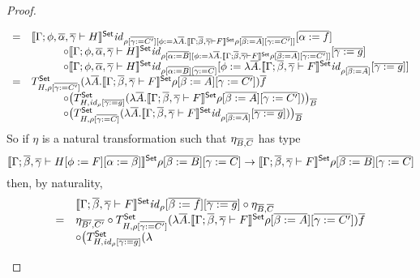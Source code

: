 \documentclass[runningheads]{llncs}
\newcommand{\set}{\mathsf{Set}}
\renewcommand{\id}{\mathit{id}}
\renewcommand{\id}{\mathit{id}}
\begin{document}
\begin{proof}
\begin{itemize}
\[\begin{array}{ll}
=& \setsem{\Gamma; \phi, \ol{\alpha}, \ol{\gamma} \vdash H} \id_{\rho
  [\ol{\gamma := C'}][\phi := \lambda \ol{A}. \setsem{\Gamma;
      \ol{\beta}, \ol{\gamma} \vdash F} \rho [\ol{\beta := A}]
    [\ol{\gamma := C'}]]} [\ol{\alpha := f}] \\
&\hspace{3em} \circ \setsem{\Gamma; \phi, \ol{\alpha}, \ol{\gamma}
  \vdash H} \id_{\rho [\ol{\alpha := B}][\phi := \lambda
    \ol{A}. \setsem{\Gamma; \ol{\beta}, \ol{\gamma} \vdash F} \rho
       [\ol{\beta := A}] [\ol{\gamma := C'}]]} [\ol{\gamma := g}] \\
&\hspace{3em} \circ \setsem{\Gamma; \phi, \ol{\alpha}, \ol{\gamma}
  \vdash H} \id_{\rho [\ol{\alpha := B}] [\ol{\gamma := C}]} [\phi :=
  \lambda \ol{A}. \setsem{\Gamma; \ol{\beta}, \ol{\gamma} \vdash F}
  \id_{\rho [\ol{\beta := A}]} [\ol{\gamma := g}]] \\
= & T^{\set}_{H,\rho [\ol{\gamma := C'}]} (\lambda
\ol{A}. \setsem{\Gamma; \ol{\beta}, \ol{\gamma} \vdash F} \rho
   [\ol{\beta := A}] [\ol{\gamma := C'}]) \ol{f} \\
&\hspace{3em} \circ \big( T^{\set}_{H,\id_{\rho}[\ol{\gamma := g}]}
   (\lambda \ol{A}. \setsem{\Gamma; \ol{\beta}, \ol{\gamma} \vdash F}
   \rho [\ol{\beta := A}] [\ol{\gamma := C'}]) \big)_{\ol{B}} \\
&\hspace{3em} \circ \big( T^{\set}_{H,\rho [\ol{\gamma := C}]} (\lambda
   \ol{A}. \setsem{\Gamma; \ol{\beta}, \ol{\gamma} \vdash F} \id_{\rho
     [\ol{\beta := A}]} [\ol{\gamma := g}]) \big)_{\ol{B}}
\end{array}\]
So if $\eta$ is a natural transformation such that $\eta_{\overline{B}, \overline{C}}$ has type
\[
\setsem{\Gamma; \ol{\beta},
  \ol{\gamma} \vdash H[\phi := F][\ol{\alpha := \beta}]}\rho
[\ol{\beta := B}] [\ol{\gamma := C}]
\to
\setsem{\Gamma; \ol{\beta},
   \ol{\gamma} \vdash F}\rho [\ol{\beta := B}] [\ol{\gamma := C}]\]
then, by naturality,
\[\begin{array}{ll}
 & \setsem{\Gamma; \ol{\beta}, \ol{\gamma} \vdash F} \id_{\rho}
       [\ol{\beta := f}] [\ol{\gamma := g}] \circ \eta_{\ol{B},
         \ol{C}} \\ 
= & \eta_{\ol{B'}, \ol{C'}} \circ T^{\set}_{H,\rho [\ol{\gamma := C'}]}
(\lambda \ol{A}. \setsem{\Gamma; \ol{\beta}, \ol{\gamma} \vdash F}
\rho [\ol{\beta := A}] [\ol{\gamma := C'}]) \ol{f} \\
& \circ \big( T^{\set}_{H,\id_{\rho}[\ol{\gamma := g}]} (\lambda

\end{array}\]
\end{itemize}
\end{proof}
\end{document}
